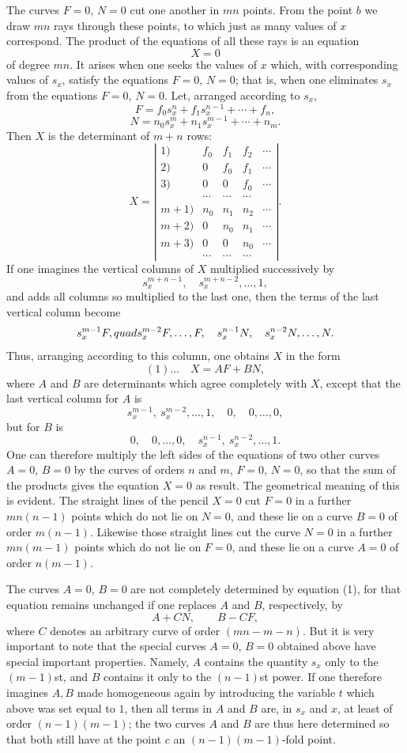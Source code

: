 \documentclass[10pt]{article}
\begin{document}
The curves $F=0$, $N=0$ cut one another in $mn$ points. From the point $b$ we draw $mn$ rays through these points, to which just as many values of $x$ correspond. The product of the equations of all these rays is an equation
\[
X=0
\]
of degree $mn$. It arises when one seeks the values of $x$ which, with corresponding values of $s_x$, satisfy the equations $F=0$, $N=0$; that is, when one eliminates $s_x$ from the equations $F=0$, $N=0$. Let, arranged according to $s_x$,
\[
F=f_0s_x^n+f_1s_x^{n-1}+\cdots+f_n,
\]
\[
N=n_0s_x^m+n_1s_x^{m-1}+\cdots+n_m.
\]
Then $X$ is the determinant of $m+n$ rows:
\[
X=\left|\begin{array}{r|cccc}
1)&f_0&f_1&f_2&\cdots\\
2)&0&f_0&f_1&\cdots\\
3)&0&0&f_0&\cdots\\
&\cdots&\cdots&\cdots&\\
m+1)&n_0&n_1&n_2&\cdots\\
m+2)&0&n_0&n_1&\cdots\\
m+3)&0&0&n_0&\cdots\\
&\cdots&\cdots&\cdots&
\end{array}\right|.
\]
If one imagines the vertical columns of $X$ multiplied successively by
\[
s_x^{m+n-1},\quad s_x^{m+n-2},\ldots,1,
\]
and adds all columns so multiplied to the last one, then the terms of the last vertical column become
\[
s_x^{m-1}F,\\quad s_x^{m-2}F,\ldots,F,\quad s_x^{n-1}N,\quad s_x^{n-2}N,\ldots,N.
\]
Thus, arranging according to this column, one obtains $X$ in the form
\[
(1)\ldots\quad X=AF+BN,
\]
where $A$ and $B$ are determinants which agree completely with $X$, except that the last vertical column for $A$ is
\[
s_x^{m-1},\ s_x^{m-2},\ldots,1,\quad 0,\quad 0,\ldots,0,
\]
but for $B$ is
\[
0,\quad 0,\ldots,0,\quad s_x^{n-1},\ s_x^{n-2},\ldots,1.
\]
One can therefore multiply the left sides of the equations of two other curves $A=0$, $B=0$ by the curves of orders $n$ and $m$, $F=0$, $N=0$, so that the sum of the products gives the equation $X=0$ as result. The geometrical meaning of this is evident. The straight lines of the pencil $X=0$ cut $F=0$ in a further $mn(n-1)$ points which do not lie on $N=0$, and these lie on a curve $B=0$ of order $m(n-1)$. Likewise those straight lines cut the curve $N=0$ in a further $mn(m-1)$ points which do not lie on $F=0$, and these lie on a curve $A=0$ of order $n(m-1)$.

The curves $A=0$, $B=0$ are not completely determined by equation (1), for that equation remains unchanged if one replaces $A$ and $B$, respectively, by
\[
A+CN,\qquad B-CF,
\]
where $C$ denotes an arbitrary curve of order $(mn-m-n)$. But it is very important to note that the special curves $A=0$, $B=0$ obtained above have special important properties. Namely, $A$ contains the quantity $s_x$ only to the $(m-1)$st, and $B$ contains it only to the $(n-1)$st power. If one therefore imagines $A,B$ made homogeneous again by introducing the variable $t$ which above was set equal to $1$, then all terms in $A$ and $B$ are, in $s_x$ and $x$, at least of order $(n-1)(m-1)$; the two curves $A$ and $B$ are thus here determined so that both still have at the point $c$ an $(n-1)(m-1)$-fold point.
\end{document}
